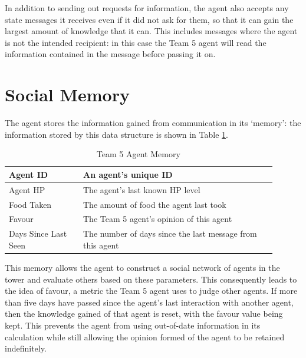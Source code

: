 In addition to sending out requests for information, the agent also accepts any state messages it receives even if it did not ask for them, so that it can gain the largest amount of knowledge that it can. This includes messages where the agent is not the intended recipient: in this case the Team 5 agent will read the information contained in the message before passing it on.

\section{Social Memory}\label{sec:team5-memory}
The agent stores the information gained from communication in its `memory': the information stored by this data structure is shown in Table \ref{tab:team5-memory}.

\begin{table}
    \centering
    \begin{tabular}%
        {| >{\raggedleft\arraybackslash}p{0.25\linewidth} | %
        >{\raggedright\arraybackslash}p{0.65\linewidth} | %
        }
        \hline
        Agent ID & An agent's unique ID\\
        \hline
        Agent HP & The agent's last known HP level\\
        \hline
        Food Taken & The amount of food the agent last took\\
        \hline
        Favour & The Team 5 agent's opinion of this agent\\
        \hline
        Days Since Last Seen & The number of days since the last message from this agent\\
        \hline
    \end{tabular}
    \caption{Team 5 Agent Memory}
    \label{tab:team5-memory}
\end{table}

This memory allows the agent to construct a social network of agents in the tower and evaluate others based on these parameters. This consequently leads to the idea of favour, a metric the Team 5 agent uses to judge other agents. If more than five days have passed since the agent's last interaction with another agent, then the knowledge gained of that agent is reset, with the favour value being kept. This prevents the agent from using out-of-date information in its calculation while still allowing the opinion formed of the agent to be retained indefinitely.

